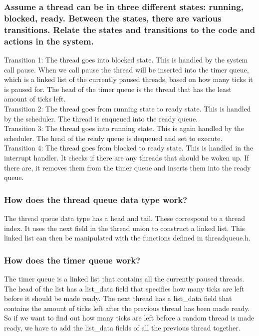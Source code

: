 \subsubsection*{Assume a thread can be in three different states: running, blocked, ready. Between the states, there are various transitions. Relate the states and transitions to the code and actions in the system.}
Transition 1: The thread goes into blocked state. This is handled by the system call pause. When we call pause the thread will be inserted into the timer queue, which is a linked list of the currently paused threads, based on how many ticks it is paused for.  The head of the timer queue is the thread that has the least amount of ticks left.\\
Transition 2: The thread goes from running state to ready state. This is handled by the scheduler. The thread is enqueued into the ready queue.\\
Transition 3: The thread goes into running state. This is again handled by the scheduler. The head of the ready queue is dequeued and set to execute.\\
Transition 4: The thread goes from blocked to ready state. This is handled in the interrupt handler. It checks if there are any threads that should be woken up. If there are, it removes them from the timer queue and inserts them into the ready queue.

\subsubsection*{How does the thread queue data type work?}
The thread queue data type has a head and tail. These correspond to a thread index. It uses the next field in the thread union to construct a linked list. This linked list can then be manipulated with the functions defined in threadqueue.h.\\
\subsubsection*{How does the timer queue work?}
The timer queue is a linked list that contains all the currently paused threads. The head of the list has a list\_{}data field that specifies how many ticks are left before it should be made ready. The next thread has a list\_{}data field that contains the amount of ticks left after the previous thread has been made ready. So if we want to find out how many ticks are left before a random thread is made ready, we have to add the list\_{}data fields of all the previous thread together.\\


